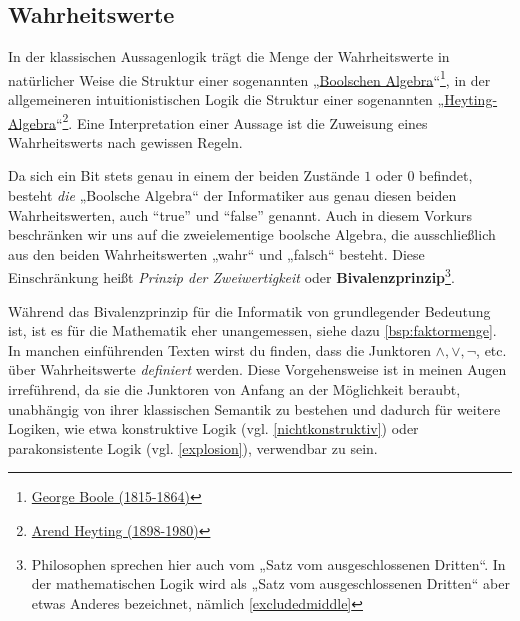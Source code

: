 \subsection*{Wahrheitswerte}


\begin{vorschau}[Bivalenzprinzip] \label{bivalenz} 
    In der klassischen Aussagenlogik trägt die Menge der Wahrheitswerte in natürlicher Weise die Struktur einer sogenannten „\href{https://en.wikipedia.org/wiki/Boolean_algebra_(structure)}{Boolschen Algebra}“\footnote{\href{https://de.wikipedia.org/wiki/George_Boole}{George Boole (1815-1864)}}, in der allgemeineren intuitionistischen Logik die Struktur einer sogenannten „\href{https://ncatlab.org/nlab/show/Heyting+algebra}{Heyting-Algebra}“\footnote{\href{https://de.wikipedia.org/wiki/Arend_Heyting}{Arend Heyting (1898-1980)}}. Eine Interpretation einer Aussage ist die Zuweisung eines Wahrheitswerts nach gewissen Regeln.
    
    Da sich ein Bit stets genau in einem der beiden Zustände $1$ oder $0$ befindet, besteht \emph{die} „Boolsche Algebra“ der Informatiker aus genau diesen beiden Wahrheitswerten, auch ``true'' und ``false'' genannt. Auch in diesem Vorkurs beschränken wir uns auf die zweielementige boolsche Algebra, die ausschließlich aus den beiden Wahrheitswerten „wahr“ und „falsch“ besteht. Diese Einschränkung heißt \emph{Prinzip der Zweiwertigkeit} oder \textbf{Bivalenzprinzip}\footnote{Philosophen sprechen hier auch vom „Satz vom ausgeschlossenen Dritten“. In der mathematischen Logik wird als „Satz vom ausgeschlossenen Dritten“ aber etwas Anderes bezeichnet, nämlich \cref{excludedmiddle}}.
    
    Während das Bivalenzprinzip für die Informatik von grundlegender Bedeutung ist, ist es für die Mathematik eher unangemessen, siehe dazu \cref{bsp:faktormenge}. In manchen einführenden Texten wirst du finden, dass die Junktoren $\land,\lor,\neg$, etc. über Wahrheitswerte \emph{definiert} werden. Diese Vorgehensweise ist in meinen Augen irreführend, da sie die Junktoren von Anfang an der Möglichkeit beraubt, unabhängig von ihrer klassischen Semantik zu bestehen und dadurch für weitere Logiken, wie etwa konstruktive Logik (vgl. \cref{nichtkonstruktiv}) oder parakonsistente Logik (vgl. \cref{explosion}), verwendbar zu sein.
\end{vorschau}


\begin{comment}
\begin{bem}[* „Konstante“ Aussagen]
    In der Aussagenlogik kann es bequem sein, Aussagezeichen einzuführen, die für eine Aussage stehen, die stets wahr oder stets falsch sein sollen:
    \begin{itemize}
        \item Mit „$\top$“ (wie englisch ``true'') ist eine Aussage gemeint, die in einem absoluten Sinn immer wahr sein soll.
        \item Mit „$\bot$“ ist eine Aussage gemeint, die in einem absoluten Sinn falsch sein soll, unabhängig davon, wie sie interpretiert wird.
    \end{itemize}
\end{bem}
\end{comment}
 

